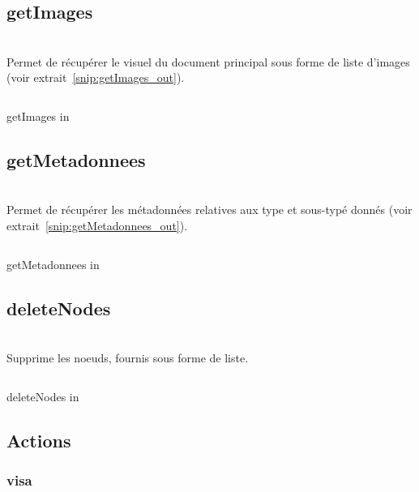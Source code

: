 \subsection{getImages}
\\

Permet de récupérer le visuel du document principal sous forme de liste d'images (voir extrait~\ref{snip:getImages_out}).

\begin{codesnippet}
\inputminted[frame=single,linenos,fontsize=\footnotesize]{javascript}{extraits/getImages_in.js}
\caption{getImages in}
\label{snip:getImages_in}
\end{codesnippet}


\subsection{getMetadonnees}
\\

Permet de récupérer les métadonnées relatives aux type et sous-typé donnés (voir extrait~\ref{snip:getMetadonnees_out}).

\begin{codesnippet}
\inputminted[frame=single,linenos,fontsize=\footnotesize]{javascript}{extraits/getMetadonnees_in.js}
\caption{getMetadonnees in}
\label{snip:getMetadonnees_in}
\end{codesnippet}


\subsection{deleteNodes}
\\

Supprime les noeuds, fournis sous forme de liste.

\begin{codesnippet}
\inputminted[frame=single,linenos,fontsize=\footnotesize]{javascript}{extraits/deleteNodes_in.js}
\caption{deleteNodes in}
\label{snip:deleteNodes_in}
\end{codesnippet}


\subsection{Actions}

\subsubsection{visa}
\\

